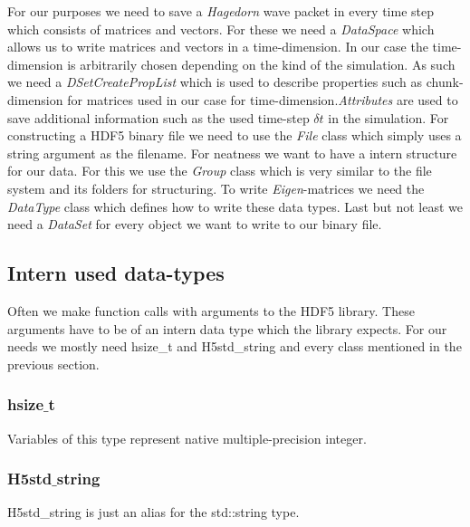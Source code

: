 \documentclass{article}
\begin{document}
For our purposes we need to save a \textit{Hagedorn} wave packet in every time step which consists of matrices and vectors. For these we need a \textit{DataSpace} which allows us to write matrices and vectors in a time-dimension. In our case the time-dimension is arbitrarily chosen depending on the kind of the simulation. As such we need a \textit{DSetCreatePropList} which is used to describe properties such as chunk-dimension for matrices used in our case for time-dimension.\textit{Attributes} are used to save additional information such as the used time-step $\delta t$ in the simulation. For constructing a HDF5 binary file we need to use the \textit{File} class which simply uses a string argument as the filename. For neatness we want to have a intern structure for our data. For this we use the \textit{Group} class which is very similar to the file system and its folders for structuring. To write \textit{Eigen}-matrices we need the \textit{DataType} class which defines how to write these data types. Last but not least we need a \textit{DataSet} for every object we want to write to our binary file.

\subsection{Intern used data-types}
Often we make function calls with arguments to the HDF5 library. These arguments have to be of an intern data type which the library expects. For our needs we mostly need hsize\_t and H5std\_string and every class mentioned in the previous section.
\subsubsection{hsize$\_$t}
Variables of this type represent native multiple-precision integer. 
\subsubsection{H5std$\_$string}
H5std\_string is just an alias for the std::string type.
\end{document}
